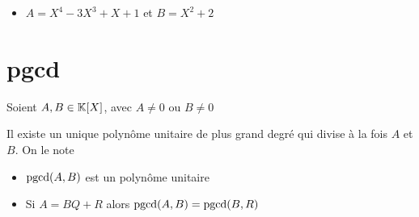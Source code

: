 \begin{frame}
\begin{exemple}
\begin{itemize}
  \item $A=X^4-3X^3+X+1$ \quad et \quad  $B=X^2+2$
 
\end{itemize}
\pause
\pause
{}
\end{exemple}
\end{frame}



\section{pgcd}

\begin{frame}
Soient  $A,B \in\mathbb{K}[X]$, avec $A \neq 0$ ou $B \neq 0$
\begin{proposition} 
\label{prop_pgcd1}
Il existe un unique polynôme unitaire de plus grand degré qui divise à la fois $A$ et $B$.
\pause
On le note 
\end{proposition}


\bigskip
\pause

\begin{remarque}
\begin{itemize}
  \item $\mathop{\text{pgcd}}\nolimits(A,B)$ est un polynôme unitaire
\pause 
  \item Si $A=BQ+R$ alors $\mathop{\text{pgcd}}\nolimits(A,B) = \mathop{\text{pgcd}}\nolimits(B,R)$
\end{itemize}
\end{remarque}


\end{frame}

